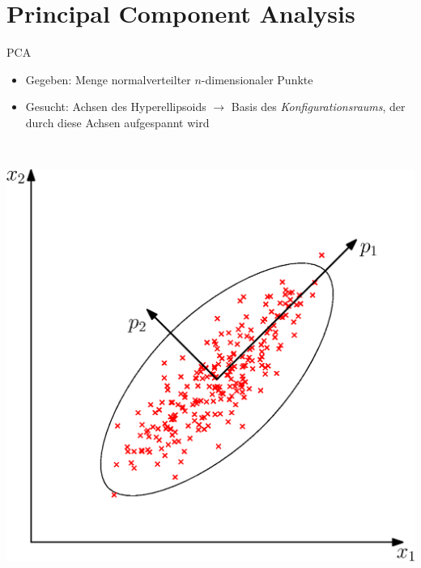 \documentclass{beamer}
\begin{document}
\section{Principal Component Analysis}
\begin{frame}{PCA}
 \begin{minipage}{0.6\textwidth}
   \begin{itemize}
    \item Gegeben: Menge normalverteilter $n$-dimensionaler Punkte
    \item Gesucht: Achsen des Hyperellipsoids $\rightarrow$ Basis des \emph{Konfigurationsraums}, der durch diese Achsen aufgespannt wird
  \end{itemize}
 \end{minipage}~
 \begin{minipage}{0.4\textwidth}
  \includegraphics[width=\textwidth]{graphics/pca}
 \end{minipage}
 
\end{frame}
\end{document}
